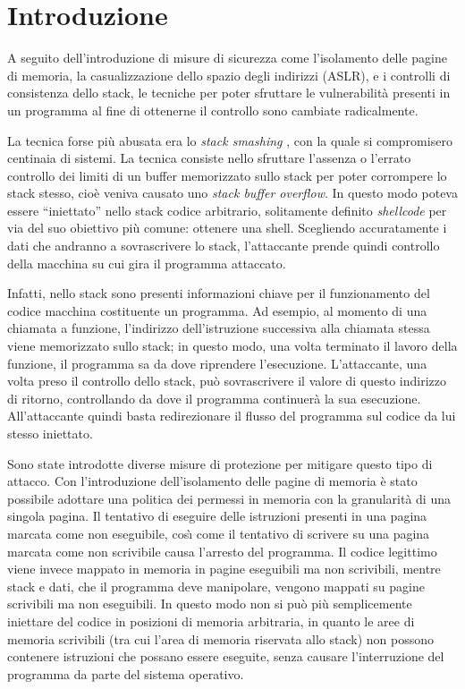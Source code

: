 \thispagestyle{empty}

\chapter*{Introduzione}


A seguito dell'introduzione di misure di sicurezza come l'isolamento
delle pagine di memoria, la casualizzazione dello spazio degli
indirizzi (ASLR), e i controlli di consistenza dello stack, le tecniche
per poter sfruttare le vulnerabilit\`{a} presenti in un programma al fine di
ottenerne il controllo sono cambiate radicalmente.

La tecnica forse pi\`{u} abusata era lo \emph{stack smashing}
\cite{Phrack-96}, con la quale si compromisero centinaia di
sistemi. La tecnica consiste nello sfruttare l'assenza o l'errato controllo dei
limiti di un buffer memorizzato sullo stack per poter corrompere lo
stack stesso, cio\`{e} veniva causato uno \emph{stack buffer overflow}. In
questo modo poteva essere ``iniettato'' nello stack codice arbitrario,
solitamente definito \emph{shellcode} per via del suo obiettivo pi\`{u}
comune: ottenere una shell. Scegliendo accuratamente i dati che
andranno a sovrascrivere lo stack, l'attaccante prende quindi controllo
della macchina su cui gira il programma attaccato.

Infatti, nello stack sono presenti informazioni chiave per il
funzionamento del codice macchina costituente un programma. Ad esempio, al momento di una chiamata a
funzione, l'indirizzo dell'istruzione successiva alla chiamata stessa viene memorizzato
sullo stack; in questo modo, una volta terminato il lavoro della
funzione, il programma sa da dove riprendere
l'esecuzione. L'attaccante, una volta preso il controllo dello stack,
pu\`{o} sovrascrivere il valore di questo indirizzo di ritorno, controllando da
dove il programma continuer\`{a} la sua esecuzione. All'attaccante quindi
basta redirezionare il flusso del programma sul codice da lui stesso
iniettato.

Sono state introdotte diverse misure di protezione per mitigare questo
tipo di attacco. Con l'introduzione dell'isolamento delle pagine di
memoria \`{e} stato possibile adottare una politica dei permessi in
memoria con la granularit\`{a} di una singola pagina. Il tentativo di eseguire
delle istruzioni presenti in una pagina marcata come non eseguibile, cos\`{\i} come il
tentativo di scrivere su una pagina marcata come non scrivibile causa l'arresto del
programma. Il codice legittimo viene invece mappato in memoria in pagine
eseguibili ma non scrivibili, mentre stack e dati, che il programma
deve manipolare, vengono mappati su pagine scrivibili ma non
eseguibili. In questo modo non si pu\`{o} pi\`{u} semplicemente iniettare del
codice in posizioni di memoria arbitraria, in quanto le aree di memoria scrivibili (tra cui l'area di
memoria riservata allo stack) non possono contenere istruzioni che
possano essere eseguite, senza causare l'interruzione del programma da parte
del sistema operativo.

